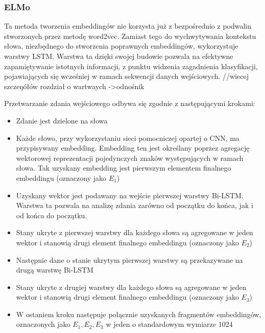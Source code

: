 \subsubsection{ELMo}

Ta metoda tworzenia embeddingów nie korzysta już z bezpośrednio z podwalin stworzonych przez metodę word2vec. Zamiast tego do wychwytywania kontekstu słowa, niezbędnego do stworzenia poprawnych embeddingów, wykorzystuje warstwy LSTM. Warstwa ta dzięki swojej budowie pozwala na efektywne zapamiętywanie istotnych informacji, z punktu widzenia zagadnienia klasyfikacji, pojawiających się wcześniej w ramach sekwencji danych wejściowych. 
//wiecej szczeŋółów rozdział o wartwaych  ->odnośnik

 

Przetwarzanie zdania wejściowego odbywa się zgodnie z następującymi krokami: 

\begin{itemize}
    \item Zdanie jest dzielone na słowa 
    \item Każde słowo, przy wykorzystaniu sieci pomocniczej opartej o CNN, ma przypisywany embedding. Embedding ten jest określany poprzez agregację wektorowej reprezentacji pojedynczych znaków występujących w ramach słowa. Tak uzyskany embedding jest pierwszym elementem finalnego embeddingu (oznaczony jako $E_1$)
    \item Uzyskany wektor jest podawany na wejście pierwszej warstwy Bi-LSTM. Warstwa ta pozwala na analizę zdania zarówno od początku do końca, jak i od końca do początku. 
    \item  Stany ukryte z pierwszej warstwy dla każdego słowa są agregowane w jeden wektor i stanowią drugi element finalnego embeddingu (oznaczony jako $E_2$) 
    \item Następnie dane o stanie ukrytym pierwszej warstwy są przekazywane na drugą warstwę Bi-LSTM 
    \item Stany ukryte z drugiej warstwy dla każdego słowa są agregowane w jeden wektor i stanowią drugi element finalnego embeddingu (oznaczony jako $E_3$) 
    \item W ostaniem kroku następuje połącznie uzyskanych fragmentów embeddingów, oznaczonych jako $E_1,E_2, E_3$ w jeden o standardowym wymiarze 1024 
\end{itemize}

 



